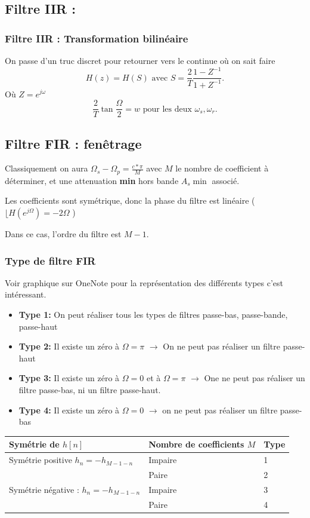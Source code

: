 \documentclass{article}
\theoremstyle{plain}%
\theoremstyle{definition}
\theoremstyle{remark}
\begin{document}
\subsection{Filtre IIR :}
\subsubsection{Filtre IIR : Transformation bilinéaire}
On passe d'un truc discret pour retourner vers le continue où on sait faire 
\[
    H(z) = H(S) \text{ avec } S = \frac{2}{T} \frac{1 - Z^{-1}}{1 + Z^{-1}}
.\]
Où $ Z = e^{j \omega } $ 
\[
    \frac{2}{T} \tan \frac{\Omega }{2} = w \text{ pour les deux }\omega _s, \omega _r
.\]
        
\subsection{Filtre FIR : fenêtrage}
Classiquement on aura $ \Omega _s - \Omega _p = \frac{c*\pi }{M} $ avec $ M $ le nombre de coefficient à déterminer, et une attenuation \textbf{min} hors bande $ A_s \min  $ associé.

Les coefficients sont symétrique, donc la phase du filtre est linéaire ($ \lfloor H(e^{j \Omega }) = -2 \Omega $ )

Dans ce cas, l'ordre du filtre est $ M - 1 $.

\subsubsection{Type de filtre FIR}
Voir graphique sur OneNote pour la représentation des différents types c'est intéressant.
\begin{itemize}
    \item \textbf{Type 1:} On peut réaliser tous les types de filtres passe-bas, passe-bande, passe-haut
    \item \textbf{Type 2:} Il existe un zéro à $ \Omega = \pi  $ $\rightarrow$ On ne peut pas réaliser un filtre passe-haut
    \item \textbf{Type 3:} Il existe un zéro à $ \Omega = 0 $ et à $ \Omega = \pi  $ $\rightarrow$ One ne peut pas réaliser un filtre passe-bas, ni un filtre passe-haut.
    \item \textbf{Type 4:} Il existe un zéro à $ \Omega = 0 $ $\rightarrow$ on ne peut pas réaliser un filtre passe-bas
\end{itemize}
\begin{table}[!ht]
    \centering
    \begin{tabular}{|l|l|l|}
    \hline
        Symétrie de $h[n]$ & Nombre de coefficients $M$ & Type \\ \hline
        Symétrie positive $ h_n = - h_{M-1-n} $ & Impaire & 1 \\ \hline
        ~ & Paire & 2 \\ \hline
        Symétrie négative : $ h_n = - h_{M-1-n} $  & Impaire & 3 \\ \hline
        ~ & Paire & 4 \\ \hline
    \end{tabular}
\end{table}
\end{document}
